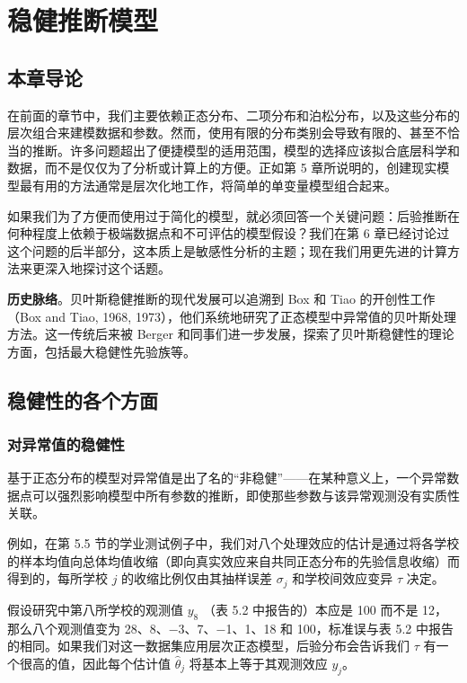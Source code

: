 
\chapter{稳健推断模型}

\section{本章导论}

在前面的章节中，我们主要依赖正态分布、二项分布和泊松分布，以及这些分布的层次组合来建模数据和参数。然而，使用有限的分布类别会导致有限的、甚至不恰当的推断。许多问题超出了便捷模型的适用范围，模型的选择应该拟合底层科学和数据，而不是仅仅为了分析或计算上的方便。正如第 5 章所说明的，创建现实模型最有用的方法通常是层次化地工作，将简单的单变量模型组合起来。

如果我们为了方便而使用过于简化的模型，就必须回答一个关键问题：后验推断在何种程度上依赖于极端数据点和不可评估的模型假设？我们在第 6 章已经讨论过这个问题的后半部分，这本质上是敏感性分析的主题；现在我们用更先进的计算方法来更深入地探讨这个话题。

\textbf{历史脉络}。贝叶斯稳健推断的现代发展可以追溯到 Box 和 Tiao 的开创性工作（Box and Tiao, 1968, 1973），他们系统地研究了正态模型中异常值的贝叶斯处理方法。这一传统后来被 Berger 和同事们进一步发展，探索了贝叶斯稳健性的理论方面，包括最大稳健性先验族等。

\section{稳健性的各个方面}

\subsection{对异常值的稳健性}

基于正态分布的模型对异常值是出了名的``非稳健''——在某种意义上，一个异常数据点可以强烈影响模型中所有参数的推断，即使那些参数与该异常观测没有实质性关联。

例如，在第 5.5 节的学业测试例子中，我们对八个处理效应的估计是通过将各学校的样本均值向总体均值收缩（即向真实效应来自共同正态分布的先验信息收缩）而得到的，每所学校 $j$ 的收缩比例仅由其抽样误差 $\sigma_j$ 和学校间效应变异 $\tau$ 决定。

假设研究中第八所学校的观测值 $y_8$ （表 5.2 中报告的）本应是 100 而不是 12，那么八个观测值变为 28、8、−3、7、−1、1、18 和 100，标准误与表 5.2 中报告的相同。如果我们对这一数据集应用层次正态模型，后验分布会告诉我们 $\tau$ 有一个很高的值，因此每个估计值 $\hat{\theta}_j$ 将基本上等于其观测效应 $y_j$。

